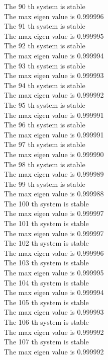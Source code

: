 \documentclass[11pt]{article}
\begin{document}
The 90 th system is stable \\
The max eigen value is 0.999996 \\
The 91 th system is stable \\
The max eigen value is 0.999995 \\
The 92 th system is stable \\
The max eigen value is 0.999994 \\
The 93 th system is stable \\
The max eigen value is 0.999993 \\
The 94 th system is stable \\
The max eigen value is 0.999992 \\
The 95 th system is stable \\
The max eigen value is 0.999991 \\
The 96 th system is stable \\
The max eigen value is 0.999991 \\
The 97 th system is stable \\
The max eigen value is 0.999990 \\
The 98 th system is stable \\
The max eigen value is 0.999989 \\
The 99 th system is stable \\
The max eigen value is 0.999988 \\
The 100 th system is stable \\
The max eigen value is 0.999997 \\
The 101 th system is stable \\
The max eigen value is 0.999997 \\
The 102 th system is stable \\
The max eigen value is 0.999996 \\
The 103 th system is stable \\
The max eigen value is 0.999995 \\
The 104 th system is stable \\
The max eigen value is 0.999994 \\
The 105 th system is stable \\
The max eigen value is 0.999993 \\
The 106 th system is stable \\
The max eigen value is 0.999992 \\
The 107 th system is stable \\
The max eigen value is 0.999992 \\
\end{document}
